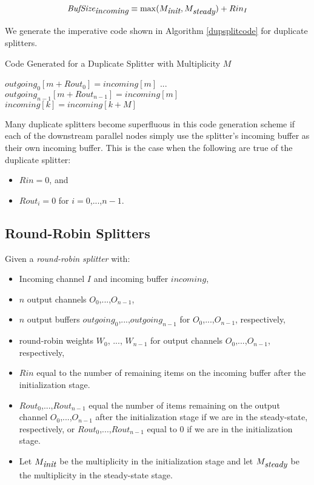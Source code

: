 \documentclass[10pt, letterpaper, onecolumn]{article}
\begin{document}
\begin{displaymath}
\mbox{\it BufSize}_{\mbox{\it incoming}} \equiv \max(M_{\mbox{\it init}}, M_{\mbox{\it steady}}) + Rin_I
\end{displaymath}

We generate the imperative code shown in Algorithm \ref{dupsplitcode}
for duplicate splitters.

\begin{algorithm}
\caption{Code Generated for a Duplicate Splitter with Multiplicity $M$}
\label{dupsplitcode}
\begin{algorithmic}
\STATE ${outgoing}_0[m + {Rout}_0] = {incoming}[m]$
\STATE ...
\STATE ${outgoing}_{n-1}[m + {Rout}_{n-1}] = {incoming}[m]$
\ENDFOR
{}
\STATE ${incoming}[k] = {incoming}[k + M]$
\ENDFOR 
\end{algorithmic}
\end{algorithm}

Many duplicate splitters become superfluous in this code generation scheme
if each of the downstream parallel nodes simply use the splitter's
incoming buffer as their own incoming buffer.  This is the case when
the following are true of the duplicate splitter:
\begin{itemize}
\item ${Rin} = 0$, and
\item $Rout_i = 0$ for $i = 0$,...,$n-1$.
\end{itemize}

\subsection{Round-Robin Splitters}

Given a {\it round-robin splitter} with:

\begin{itemize}
\item Incoming channel $I$ and incoming buffer ${incoming}$,
\item $n$ output channels $O_0$,...,$O_{n-1}$,
\item $n$ output buffers ${outgoing}_0$,...,${outgoing}_{n-1}$ for
  $O_0$,...,$O_{n-1}$, respectively,
\item round-robin weights $W_0$, ..., $W_{n-1}$ for output channels
  $O_0$,...,$O_{n-1}$, respectively,
\item $Rin$ equal to the number of remaining items on the incoming
  buffer after the initialization stage.
\item ${Rout}_0$,...,${Rout}_{n-1}$ equal the number of items remaining
  on the output channel $O_0$,...,$O_{n-1}$ after the initialization
  stage if we are in the steady-state, respectively, or
  ${Rout}_0$,...,${Rout}_{n-1}$ equal to $0$ if we are in the
  initialization stage. 
\item Let $M_{\mbox{\it init}}$ be the multiplicity in the initialization
  stage and let $M_{\mbox{\it steady}}$ be the multiplicity in the
  steady-state stage.
\end{itemize}
\end{document}

